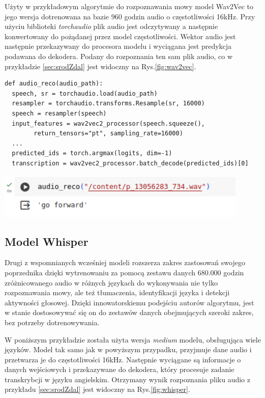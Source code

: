 Użyty w przykładowym algorytmie do rozpoznawania mowy model Wav2Vec to jego wersja dotrenowana na bazie \num{960} godzin audio o częstotliwości \num{16}kHz. Przy użyciu biblioteki \textit{torchaudio} plik audio jest odczytywany a następnie konwertowany do pożądanej przez model częstotliwości. Wektor audio jest następnie przekazywany do procesora modelu i wyciągana jest predykcja podawana do dekodera. Podany do rozpoznania ten sam plik audio, co w przykładzie \ref{sec:srodZdal} jest widoczny na Rys.\ref{fig:wav2vec}.

\begin{lstlisting}
def audio_reco(audio_path):
  speech, sr = torchaudio.load(audio_path)
  resampler = torchaudio.transforms.Resample(sr, 16000)
  speech = resampler(speech)
  input_features = wav2vec2_processor(speech.squeeze(), 
        return_tensors="pt", sampling_rate=16000)
  ...
  predicted_ids = torch.argmax(logits, dim=-1)
  transcription = wav2vec2_processor.batch_decode(predicted_ids)[0]
\end{lstlisting}

\begin{center}
    \includegraphics[width=12cm]{files/wav2vectest.png}
    \label{fig:wav2vec}
\end{center}


\subsection{Model Whisper}
\label{subsec:whisper}

Drugi z wspomnianych wcześniej modeli rozszerza zakres zastosowań swojego poprzednika dzięki wytrenowaniu za pomocą zestawu danych \num{680,000} godzin zróżnicowanego audio w różnych językach do wykonywania nie tylko rozpoznawania mowy, ale też tłumaczenia, identyfikacji języka i detekcji aktywności głosowej. Dzięki innowatorskiemu podejściu autorów algorytmu, jest w stanie dostosowywać się on do zestawów danych obejmujących szeroki zakres, bez potrzeby dotrenowywania.

W poniższym przykładzie została użyta wersja \textit{medium} modelu, obsługująca wiele języków. Model tak samo jak w powyższym przypadku, przyjmuje dane audio i przetwarza je do częstotliwości \num{16}kHz. Następnie wyciągane są informacje o danych wejściowych i przekazywane do dekodera, który procesuje zadanie transkrybcji w języku angielskim. Otrzymany wynik rozpoznania pliku audio z przykładu \ref{sec:srodZdal} jest widoczny na Rys.\ref{fig:whisper}.

